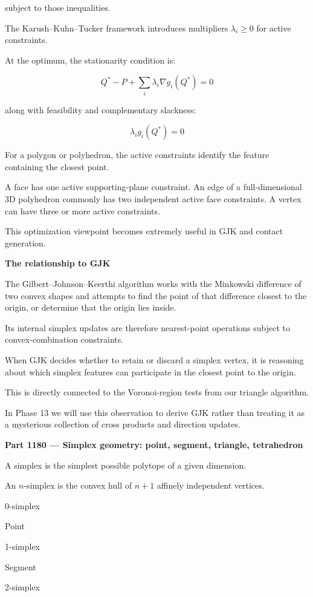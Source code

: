 subject to those inequalities.

The Karush--Kuhn--Tucker framework introduces multipliers \(\lambda_i\ge0\) for active constraints.

At the optimum, the stationarity condition is:

\[
Q^*-P+\sum_i\lambda_i\nabla g_i(Q^*)=0
\]

along with feasibility and complementary slackness:

\[
\lambda_i g_i(Q^*)=0
\]

For a polygon or polyhedron, the active constraints identify the feature containing the closest point.

A face has one active supporting-plane constraint. An edge of a full-dimensional 3D polyhedron commonly has two independent active face constraints. A vertex can have three or more active constraints.

This optimization viewpoint becomes extremely useful in GJK and contact generation.

\textbf{The relationship to GJK}

The Gilbert--Johnson--Keerthi algorithm works with the Minkowski difference of two convex shapes and attempts to find the point of that difference closest to the origin, or determine that the origin lies inside.

Its internal simplex updates are therefore nearest-point operations subject to convex-combination constraints.

When GJK decides whether to retain or discard a simplex vertex, it is reasoning about which simplex features can participate in the closest point to the origin.

This is directly connected to the Voronoi-region tests from our triangle algorithm.

In Phase 13 we will use this observation to derive GJK rather than treating it as a mysterious collection of cross products and direction updates.

\textbf{Part 1180 --- Simplex geometry: point, segment, triangle, tetrahedron}

A simplex is the simplest possible polytope of a given dimension.

An \(n\)-simplex is the convex hull of \(n+1\) affinely independent vertices.

0-simplex

Point

1-simplex

Segment

2-simplex

